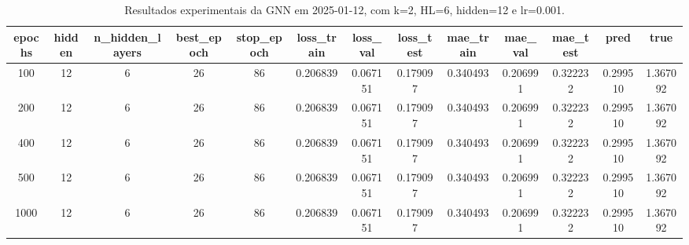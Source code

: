 \begin{table}[h]
\centering
\caption{Resultados experimentais da GNN em 2025-01-12, com k=2, HL=6, hidden=12 e lr=0.001.}
\label{tab:gnn_results_k2_hl6_h12_d20250112}
\begin{tabular}{ccccccccccccc}
\toprule
epochs & hidden & n\_hidden\_layers & best\_epoch & stop\_epoch & loss\_train & loss\_val & loss\_test & mae\_train & mae\_val & mae\_test & pred & true \\
\midrule
100 & 12 & 6 & 26 & 86 & 0.206839 & 0.067151 & 0.179097 & 0.340493 & 0.206991 & 0.322232 & 0.299510 & 1.367092 \\
200 & 12 & 6 & 26 & 86 & 0.206839 & 0.067151 & 0.179097 & 0.340493 & 0.206991 & 0.322232 & 0.299510 & 1.367092 \\
400 & 12 & 6 & 26 & 86 & 0.206839 & 0.067151 & 0.179097 & 0.340493 & 0.206991 & 0.322232 & 0.299510 & 1.367092 \\
500 & 12 & 6 & 26 & 86 & 0.206839 & 0.067151 & 0.179097 & 0.340493 & 0.206991 & 0.322232 & 0.299510 & 1.367092 \\
1000 & 12 & 6 & 26 & 86 & 0.206839 & 0.067151 & 0.179097 & 0.340493 & 0.206991 & 0.322232 & 0.299510 & 1.367092 \\
\bottomrule
\end{tabular}
\end{table}
